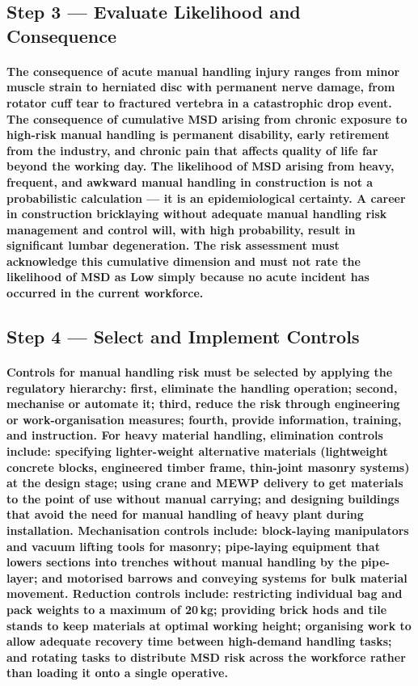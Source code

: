 \subsection{Step 3 --- Evaluate Likelihood and Consequence}
\paragraph{The consequence of acute manual handling injury ranges from minor muscle strain to herniated disc with permanent nerve damage, from rotator cuff tear to fractured vertebra in a catastrophic drop event. The consequence of cumulative MSD arising from chronic exposure to high-risk manual handling is permanent disability, early retirement from the industry, and chronic pain that affects quality of life far beyond the working day. The likelihood of MSD arising from heavy, frequent, and awkward manual handling in construction is not a probabilistic calculation --- it is an epidemiological certainty. A career in construction bricklaying without adequate manual handling risk management and control will, with high probability, result in significant lumbar degeneration. The risk assessment must acknowledge this cumulative dimension and must not rate the likelihood of MSD as Low simply because no acute incident has occurred in the current workforce.}

\subsection{Step 4 --- Select and Implement Controls}
\paragraph{Controls for manual handling risk must be selected by applying the regulatory hierarchy: first, eliminate the handling operation; second, mechanise or automate it; third, reduce the risk through engineering or work-organisation measures; fourth, provide information, training, and instruction. For heavy material handling, elimination controls include: specifying lighter-weight alternative materials (lightweight concrete blocks, engineered timber frame, thin-joint masonry systems) at the design stage; using crane and MEWP delivery to get materials to the point of use without manual carrying; and designing buildings that avoid the need for manual handling of heavy plant during installation. Mechanisation controls include: block-laying manipulators and vacuum lifting tools for masonry; pipe-laying equipment that lowers sections into trenches without manual handling by the pipe-layer; and motorised barrows and conveying systems for bulk material movement. Reduction controls include: restricting individual bag and pack weights to a maximum of 20\,kg; providing brick hods and tile stands to keep materials at optimal working height; organising work to allow adequate recovery time between high-demand handling tasks; and rotating tasks to distribute MSD risk across the workforce rather than loading it onto a single operative.}

